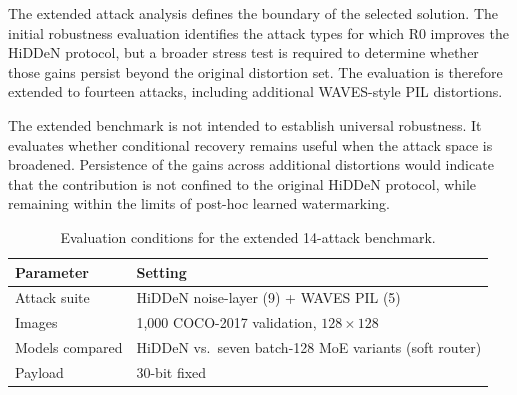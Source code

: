 ﻿\documentclass[12pt, a4paper, twoside]{report}
\numberwithin{equation}{chapter}
\begin{document}
The extended attack analysis defines the boundary of the selected solution. The initial robustness evaluation identifies the attack types for which R0 improves the HiDDeN protocol, but a broader stress test is required to determine whether those gains persist beyond the original distortion set. The evaluation is therefore extended to fourteen attacks, including additional WAVES-style PIL distortions.

The extended benchmark is not intended to establish universal robustness. It evaluates whether conditional recovery remains useful when the attack space is broadened. Persistence of the gains across additional distortions would indicate that the contribution is not confined to the original HiDDeN protocol, while remaining within the limits of post-hoc learned watermarking.

\begin{table}[H]
\centering
\begin{tabular}{ll}
\toprule
\textbf{Parameter} & \textbf{Setting} \\
\midrule
Attack suite & HiDDeN noise-layer (9) + WAVES PIL (5) \\
Images & 1{,}000 COCO-2017 validation, $128\times128$ \\
Models compared & HiDDeN vs.\ seven batch-128 MoE variants (soft router) \\
Payload & 30-bit fixed \\
\bottomrule
\end{tabular}
\caption{Evaluation conditions for the extended 14-attack benchmark.}
\label{tab:waves-survey-conditions}
\end{table}
\end{document}
